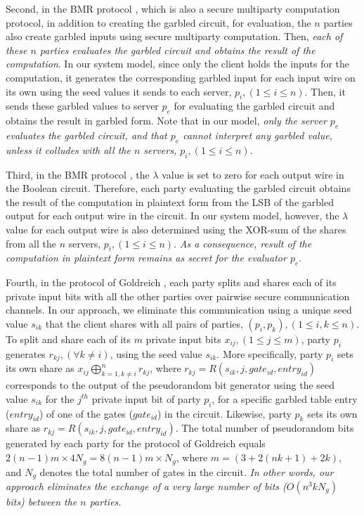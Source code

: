 \documentclass[10pt,journal,cspaper,compsoc]{IEEEtran}
\begin{document}
Second, in the BMR protocol \cite{beaver90,rogaway91}, which is also a secure multiparty computation protocol, in addition to creating the garbled circuit, for evaluation, the $n$ parties also create garbled inputs using secure multiparty computation. Then, {\em each of these $n$ parties evaluates the garbled circuit and obtains the result of the computation}. In our system model, since only the client holds the inputs for the computation, it generates the corresponding garbled input for each input wire on its own using the seed values it sends to each server, $p_i, (1\le i\le n)$. Then, it sends these garbled values to server $p_e$ for evaluating the garbled circuit and obtains the result in garbled form. Note that in our model, {\em only the server $p_e$ evaluates the garbled circuit, and
that $p_e$ cannot interpret any garbled value, unless it colludes with all the $n$ servers, $p_i, (1\le i\le n)$}.


Third, in the BMR protocol \cite{beaver90,rogaway91}, the $\lambda$ value is set to zero for each output wire in the Boolean circuit. Therefore, each party evaluating the garbled circuit obtains the result of the computation in plaintext form from the LSB of the garbled output for each output wire in the circuit. In our system model, however, the $\lambda$ value for each output wire is also determined using the XOR-sum of the shares from all the $n$ servers, $p_i, (1\le i\le n)$. {\em As a consequence, result of the computation in plaintext form remains as secret for the evaluator $p_e$}.


Fourth, in the protocol of Goldreich \cite{goldreich04,goldreich87}, each party splits and shares each of its private input bits with all the other parties over pairwise secure communication channels. In our approach, we eliminate this communication using a unique seed value $s_{ik}$ that the client shares with all pairs of parties, $(p_i,p_k), (1\le i,k\le n)$. To split and share each of its $m$ private input bits $x_{ij}, (1\le j\le m)$, party $p_i$ generates $r_{kj}, (\forall k\neq i)$, using the seed value $s_{ik}$. More specifically, party $p_i$ sets its own share as $x_{ij}\bigoplus_{k=1,k\neq i}^{n}r_{kj}$, where $r_{kj}=R(s_{ik},j,gate_{id},entry_{id})$ corresponds to the output of the pseudorandom bit generator using the seed value $s_{ik}$ for the $j^{th}$ private input bit of party $p_i$, for a specific garbled table entry ($entry_{id}$) of one of the gates ($gate_{id}$) in the circuit. Likewise, party $p_k$ sets its own share as $r_{kj}=R(s_{ik},j,gate_{id},entry_{id})$. The total number of pseudorandom bits generated by each party for the protocol of Goldreich equals $2(n-1)m\times 4N_g=8(n-1)m\times N_g$, where $m=(3+2(nk+1)+2k)$, and $N_g$ denotes the total number of gates in the circuit. {\em In other words, our approach eliminates the exchange of a very large number of bits ($O(n^3 k N_g)$ bits) between the $n$ parties.}
\end{document}
